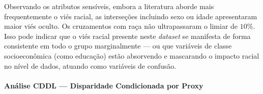 Observando os atributos sensíveis, embora a literatura aborde mais frequentemente o viés racial, as interseções incluindo sexo ou idade apresentaram maior viés oculto. Os cruzamentos com raça não ultrapassaram o limiar de $10\%$. Isso pode indicar que o viés racial presente neste \textit{dataset} se manifesta de forma consistente em todo o grupo marginalmente --- ou que variáveis de classe socioeconômica (como educação) estão absorvendo e mascarando o impacto racial no nível de dados, atuando como variáveis de confusão.

\paragraph{Análise CDDL --- Disparidade Condicionada por Proxy}

\begin{table}[H]
    \centering
    \caption{Matriz completa de CDDL por atributo protegido (vítima) $\times$ variável proxy (condição), Adult. Ordenada por CDDL decrescente.}
    \vspace{2mm}
\end{table}
